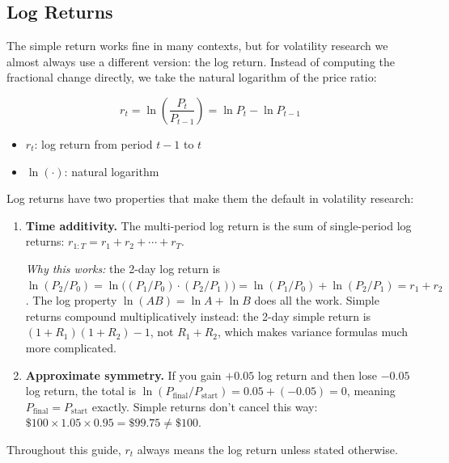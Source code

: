 \subsection{Log Returns}
\label{sec:log-returns}

The simple return works fine in many contexts, but for volatility research we almost always use a different version: the log return.
Instead of computing the fractional change directly, we take the natural logarithm of the price ratio:

\begin{equation}
  r_t = \ln\!\left(\frac{P_t}{P_{t-1}}\right) = \ln P_t - \ln P_{t-1}
  \label{eq:log-return}
\end{equation}
\begin{itemize}[nosep]
  \item $r_t$: log return from period $t-1$ to $t$
  \item $\ln(\cdot)$: natural logarithm
\end{itemize}

\begin{keyidea}
Log returns have two properties that make them the default in volatility research:
\begin{enumerate}[nosep]
  \item \textbf{Time additivity.}
  The multi-period log return is the sum of single-period log returns:
  $r_{1:T} = r_1 + r_2 + \cdots + r_T$.

  \emph{Why this works:} the 2-day log return is $\ln(P_2/P_0) = \ln\bigl((P_1/P_0)\cdot(P_2/P_1)\bigr) = \ln(P_1/P_0) + \ln(P_2/P_1) = r_1 + r_2$.
  The log property $\ln(AB) = \ln A + \ln B$ does all the work.
  Simple returns compound multiplicatively instead: the 2-day simple return is $(1+R_1)(1+R_2) - 1$, not $R_1 + R_2$, which makes variance formulas much more complicated.

  \item \textbf{Approximate symmetry.}
  If you gain $+0.05$ log return and then lose $-0.05$ log return, the total is $\ln(P_{\text{final}}/P_{\text{start}}) = 0.05 + (-0.05) = 0$, meaning $P_{\text{final}} = P_{\text{start}}$ exactly.
  Simple returns don't cancel this way: $\$100 \times 1.05 \times 0.95 = \$99.75 \neq \$100$.
\end{enumerate}
Throughout this guide, $r_t$ always means the log return unless stated otherwise.
\end{keyidea}

